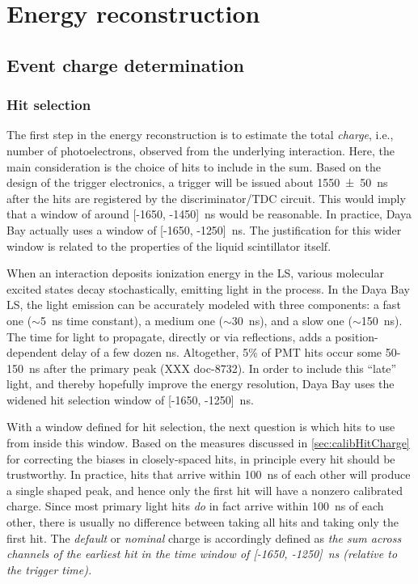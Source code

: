 \documentclass[../thesis.tex]{subfiles}
\begin{document}
\section{Energy reconstruction}
\label{sec:reconEnergy}

\subsection{Event charge determination}
\label{sec:reconEnergyCharge}

\subsubsection{Hit selection}
\label{sec:reconHitSelection}

The first step in the energy reconstruction is to estimate the total \emph{charge}, i.e., number of photoelectrons, observed from the underlying interaction. Here, the main consideration is the choice of hits to include in the sum. Based on the design of the trigger electronics, a trigger will be issued about \SI{1550 \pm 50}{ns} after the hits are registered by the discriminator/TDC circuit. This would imply that a window of around [-1650, -1450]~ns would be reasonable. In practice, Daya Bay actually uses a window of [-1650, -1250]~ns. The justification for this wider window is related to the properties of the liquid scintillator itself.

When an interaction deposits ionization energy in the LS, various molecular excited states decay stochastically, emitting light in the process. In the Daya Bay LS, the light emission can be accurately modeled with three components: a fast one ($\sim$5~ns time constant), a medium one ($\sim$30~ns), and a slow one ($\sim$150~ns). The time for light to propagate, directly or via reflections, adds a position-dependent delay of a few dozen ns. Altogether, 5\% of PMT hits occur some 50-150~ns after the primary peak (XXX doc-8732). In order to include this ``late'' light, and thereby hopefully improve the energy resolution, Daya Bay uses the widened hit selection window of [-1650, -1250]~ns.

With a window defined for hit selection, the next question is which hits to use from inside this window. Based on the measures discussed in \autoref{sec:calibHitCharge} for correcting the biases in closely-spaced hits, in principle every hit should be trustworthy. In practice, hits that arrive within 100~ns of each other will produce a single shaped peak, and hence only the first hit will have a nonzero calibrated charge. Since most primary light hits \emph{do} in fact arrive within 100~ns of each other, there is usually no difference between taking all hits and taking only the first hit. The \emph{default} or \emph{nominal} charge is accordingly defined as \emph{the sum across channels of the earliest hit in the time window of [-1650, -1250]~ns (relative to the trigger time).}
\end{document}

